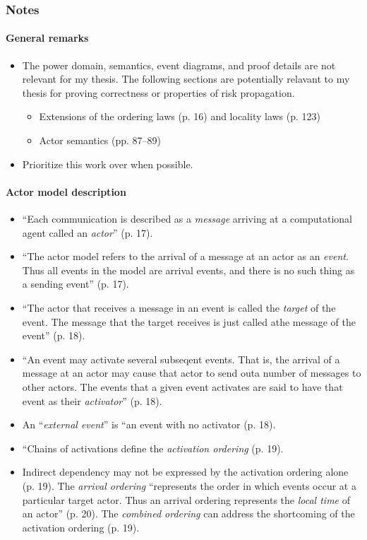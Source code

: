 \subsubsection*{Notes}
\paragraph{General remarks}
\begin{itemize}
\item The power domain, semantics, event diagrams, and proof details are not relevant for my thesis. The following sections are potentially relavant to my thesis for proving correctness or properties of risk propagation.
	\begin{itemize}
	\item Extensions of the ordering laws (p. 16) and locality laws (p. 123) \cite{Hewitt1977b}
	\item Actor semantics (pp. 87--89)
	\end{itemize}
\item Prioritize this work over \cite{Hewitt1977b} when possible.
\end{itemize}

\paragraph{Actor model description}
\begin{itemize}
\item ``Each communication is described as a \emph{message} arriving at a computational agent called an \emph{actor}'' (p. 17).
\item ``The actor model refers to the arrival of a message at an actor as an \emph{event}. Thus all events in the model are arrival events, and there is no such thing as a sending event'' (p. 17).
\item ``The actor that receives a message in an event is called the \emph{target} of the event. The message that the target receives is just called athe message of the event'' (p. 18).
\item ``An event may activate several subseqent events. That is, the arrival of a message at an actor may cause that actor to send outa number of messages to other actors. The events that a given event activates are said to have that event as their \emph{activator}'' (p. 18).
\item An ``\emph{external event}'' is ``an event with no activator (p.  18).
\item ``Chains of activations define the \emph{activation ordering} (p. 19).
\item Indirect dependency may not be expressed by the activation ordering alone (p. 19). The \emph{arrival ordering} ``represents the order in which events occur at a particular target actor. Thus an arrival ordering represents the \emph{local time} of an actor'' (p. 20). The \emph{combined ordering} can address the shortcoming of the activation ordering (p. 19).
\end{itemize}

